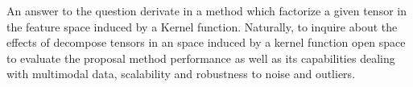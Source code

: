\documentclass[letterpaper,12pt]{article}
\begin{document}
An answer to the question derivate in a method which factorize a given tensor in the feature space induced by a Kernel function. Naturally, to inquire about the effects of decompose tensors in an space induced by a kernel function open space to evaluate the proposal method performance as well as its capabilities dealing with multimodal data, scalability and robustness to noise and outliers.





% 
% 
% 
% 
% 
% 
% 
% 
% 
% 
% 
% 
% 
\end{document}
